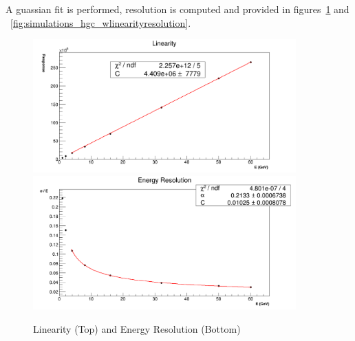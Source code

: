 A guassian fit is performed, resolution is computed and provided in figures~\ref{fig:simulations_hgc_pblinearityresolution} and ~\ref{fig:simulations_hgc_wlinearityresolution}.
 \begin{figure}[hbp]
    \centering
    \includegraphics[width=0.9\textwidth]{figures/ch_simulations/hgc/performance/Pb/Linearity.png}
    \includegraphics[width=0.9\textwidth]{figures/ch_simulations/hgc/performance/Pb/Resolution.png}
    \caption{Linearity (Top) and Energy Resolution (Bottom)}
    \label{fig:simulations_hgc_pblinearityresolution}
 \end{figure}

